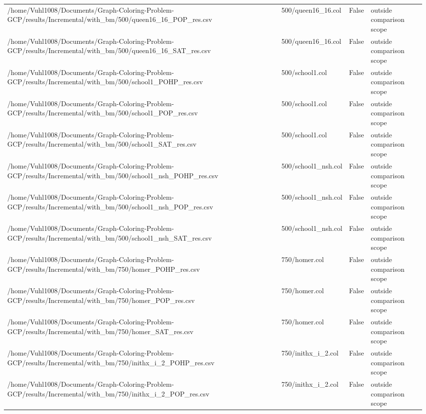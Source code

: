 \begin{table}[htbp]
\begin{tabular}{llll}
/home/Vuhl1008/Documents/Graph-Coloring-Problem-GCP/results/Incremental/with\_bm/500/queen16\_16\_POP\_res.csv & 500/queen16\_16.col & False & outside comparison scope \\
/home/Vuhl1008/Documents/Graph-Coloring-Problem-GCP/results/Incremental/with\_bm/500/queen16\_16\_SAT\_res.csv & 500/queen16\_16.col & False & outside comparison scope \\
/home/Vuhl1008/Documents/Graph-Coloring-Problem-GCP/results/Incremental/with\_bm/500/school1\_POHP\_res.csv & 500/school1.col & False & outside comparison scope \\
/home/Vuhl1008/Documents/Graph-Coloring-Problem-GCP/results/Incremental/with\_bm/500/school1\_POP\_res.csv & 500/school1.col & False & outside comparison scope \\
/home/Vuhl1008/Documents/Graph-Coloring-Problem-GCP/results/Incremental/with\_bm/500/school1\_SAT\_res.csv & 500/school1.col & False & outside comparison scope \\
/home/Vuhl1008/Documents/Graph-Coloring-Problem-GCP/results/Incremental/with\_bm/500/school1\_nsh\_POHP\_res.csv & 500/school1\_nsh.col & False & outside comparison scope \\
/home/Vuhl1008/Documents/Graph-Coloring-Problem-GCP/results/Incremental/with\_bm/500/school1\_nsh\_POP\_res.csv & 500/school1\_nsh.col & False & outside comparison scope \\
/home/Vuhl1008/Documents/Graph-Coloring-Problem-GCP/results/Incremental/with\_bm/500/school1\_nsh\_SAT\_res.csv & 500/school1\_nsh.col & False & outside comparison scope \\
/home/Vuhl1008/Documents/Graph-Coloring-Problem-GCP/results/Incremental/with\_bm/750/homer\_POHP\_res.csv & 750/homer.col & False & outside comparison scope \\
/home/Vuhl1008/Documents/Graph-Coloring-Problem-GCP/results/Incremental/with\_bm/750/homer\_POP\_res.csv & 750/homer.col & False & outside comparison scope \\
/home/Vuhl1008/Documents/Graph-Coloring-Problem-GCP/results/Incremental/with\_bm/750/homer\_SAT\_res.csv & 750/homer.col & False & outside comparison scope \\
/home/Vuhl1008/Documents/Graph-Coloring-Problem-GCP/results/Incremental/with\_bm/750/inithx\_i\_2\_POHP\_res.csv & 750/inithx\_i\_2.col & False & outside comparison scope \\
/home/Vuhl1008/Documents/Graph-Coloring-Problem-GCP/results/Incremental/with\_bm/750/inithx\_i\_2\_POP\_res.csv & 750/inithx\_i\_2.col & False & outside comparison scope \\

\end{tabular}
\end{table}
